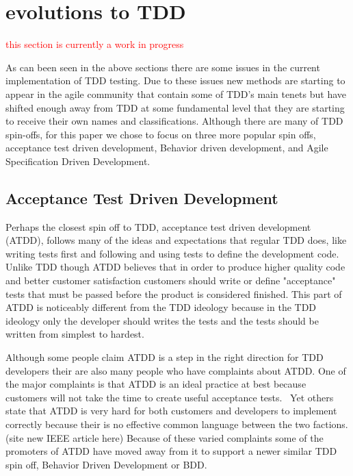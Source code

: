 \documentclass{sig-alternate}
\newcommand{\mycomment}[1]{\textcolor{red}{#1}}
\begin{document}
\section{evolutions to TDD}
\mycomment{this section is currently a work in progress}

As can been seen in the above sections there are some issues in the current implementation of TDD testing.  Due to these issues new methods are starting to appear in the agile community that contain some of TDD's main tenets but have shifted enough away from TDD at some fundamental level that they are starting to receive their own names and classifications.  Although there are many of TDD spin-offs, for this paper we chose to focus on three more popular spin offs, acceptance test driven development, Behavior driven development, and Agile Specification Driven Development.


\subsection{Acceptance Test Driven Development}

Perhaps the closest spin off to TDD, acceptance test driven development (ATDD), follows many of the ideas and expectations that regular TDD does, like writing tests first and following and using tests to define the development code.  Unlike TDD though ATDD believes that in order to produce higher quality code and better customer satisfaction customers should write or define "acceptance" tests that must be passed before the product is considered finished.  This part of ATDD is noticeably different from the TDD ideology because in the TDD ideology only the developer should writes the tests and the tests should be written from simplest to hardest.~\cite{Hammond:2012}

Although some people claim ATDD is a step in the right direction for TDD developers their are also many people who have complaints about ATDD.  One of the major complaints is that ATDD is an ideal practice at best because customers will not take the time to create useful acceptance tests.~\cite{Hammond:2012} Yet others state that ATDD is very hard for both customers and developers to implement correctly because their is no effective common language between the two factions.(site new IEEE article here)  Because of these varied complaints some of the promoters of ATDD have moved away from it to support a newer similar TDD spin off, Behavior Driven Development or BDD.
\end{document}
